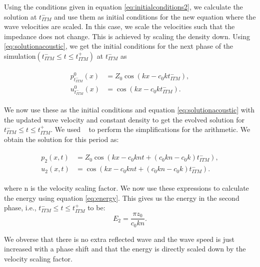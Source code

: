 Using the conditions given in equation \ref{eq:initialconditions2}, we calculate the solution at $t_{ITM}^-$ and use them as initial conditions for the new equation where the wave velocities are scaled.
In this case, we scale the velocities such that the impedance does not change. This is achieved by scaling the density down. Using \ref{eq:solutionacoustic}, we get the initial conditions for the next phase of the simulation$\left(t_{ITM}^- \leq t \leq t_{ITM}^+ \right)$ at $t_{ITM}^-$ as

\begin{align}
    \begin{split}
        p^0_{t_{ITM}^-}\left(x\right) &= Z_0 \cos\left(kx - c_0kt_{ITM}^-\right), \\
        u^0_{t_{ITM}^-}\left(x\right) &= \cos\left(kx - c_0kt_{ITM}^-\right) .
    \end{split}
\end{align}

We now use these as the initial conditions and equation \ref{eq:solutionacoustic} with the updated wave velocity and constant density to get the evolved solution for $t_{ITM}^- \leq t \leq t_{ITM}^+ $. 
We used ~\parencite{sagemath} to perform the simplifications for the arithmetic. We obtain the solution for this period as:

\begin{align}
    \begin{split}
        p_{2}\left(x, t\right) &= Z_{0} \cos\left(kx -c_{0} k n t + {\left(c_{0} k n - c_{0} k\right)} \mathit{t_{ITM}^-}\right), \\
        u_{2}\left(x, t\right) &= \cos\left(kx -c_{0} k n t + {\left(c_{0} k n - c_{0} k\right)} \mathit{t_{ITM}^-} \right) .
    \end{split}
\end{align}

where n is the velocity scaling factor. We now use these expressions to calculate the energy using equation \ref{eq:energy}. This gives us the energy in the second phase, i.e., $t_{ITM}^- \leq t \leq t_{ITM}^+ $ to be:
\begin{equation}
    E_2 = \frac{\pi z_{0}}{c_{0} k n} .
\end{equation}

We obverse that there is no extra reflected wave and the wave speed is just increased with a phase shift and that the energy is directly scaled down by the velocity scaling factor.


